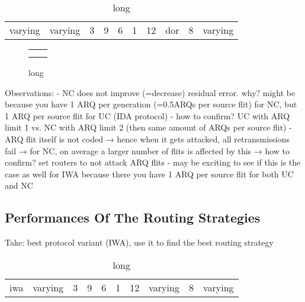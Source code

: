 \begin{table}
    \centering
    \begin{tabulary}{\textwidth}{C|C|C|C|C|C|C|C|C|C}
        \pProtVar{} & \pNCMode{} & \pEncMods{} & \pAuthMods{} & \pRQSize{} & \pARQLimit{} & \pARQTimeout{} & \pRStrat{} & \pNumAttackers{} & \pAttackProb{} \\\hline
        varying & varying & 3 & 9 & 6 & 1 & 12 & \gls{dor} & 8 & varying \\
    \end{tabulary}
    \caption[Input parameters for protocol variant experiment]{long}
    \label{tab:setupprotvarexperiment}
\end{table}

\begin{figure}
    \centering
    \begin{tabular}{ll}
         &  \\
         & 
    \end{tabular}
    \caption[Results for protocol variant experiment]{long}
    \label{fig:resultsprotvarexperiment}
\end{figure}

Observations:
- NC does not improve (=decrease) residual error. why? might be because you have 1 ARQ per generation (=0.5ARQs per source flit) for NC, but 1 ARQ per
source flit for UC (IDA protocol)
  - how to confirm? UC with ARQ limit 1 vs. NC with ARQ limit 2 (then same amount of ARQs per source flit)
  - ARQ flit itself is not coded → hence when it gets attacked, all retransmissions fail → for NC, on average a larger number of flits is affected by
    this → how to confirm? set routers to not attack ARQ flits
  - may be exciting to see if this is the case as well for IWA because there you have 1 ARQ per source flit for both UC and NC

\subsection{Performances Of The Routing Strategies}
Take: best protocol variant (IWA), use it to find the best routing strategy

\begin{table}
    \centering
    \begin{tabulary}{\textwidth}{C|C|C|C|C|C|C|C|C|C}
        \pProtVar{} & \pNCMode{} & \pEncMods{} & \pAuthMods{} & \pRQSize{} & \pARQLimit{} & \pARQTimeout{} & \pRStrat{} & \pNumAttackers{} & \pAttackProb{} \\\hline
        \gls{iwa} & varying & 3 & 9 & 6 & 1 & 12 & varying & 8 & varying \\
    \end{tabulary}
    \caption[Input parameters for main experiment]{long}
    \label{tab:setuproutingstratexperiment}
\end{table}


